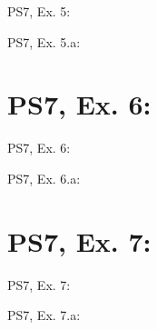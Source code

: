 \begin{frame}{PS7, Ex. 5: }
  \begin{multicols}{2}
    \vfill\null\columnbreak
    \vfill
  \end{multicols}
\end{frame}

\begin{frame}{PS7, Ex. 5.a: }
  \begin{multicols}{2}
    \vfill\null\columnbreak
    \vfill\null
  \end{multicols}
\end{frame}



\section{PS7, Ex. 6: }

\begin{frame}{PS7, Ex. 6: }
  \begin{multicols}{2}
    \vfill\null\columnbreak
    \vfill\null
  \end{multicols}
\end{frame}

\begin{frame}{PS7, Ex. 6.a: }
  \begin{multicols}{2}
    \vfill\null\columnbreak
    \vfill\null
  \end{multicols}
\end{frame}



\section{PS7, Ex. 7: }

\begin{frame}{PS7, Ex. 7: }
  \begin{multicols}{2}
    \vfill\null\columnbreak
    \vfill\null
  \end{multicols}
\end{frame}

\begin{frame}{PS7, Ex. 7.a: }
  \begin{multicols}{2}
    \vfill\null\columnbreak
    \vfill\null
  \end{multicols}
\end{frame}
